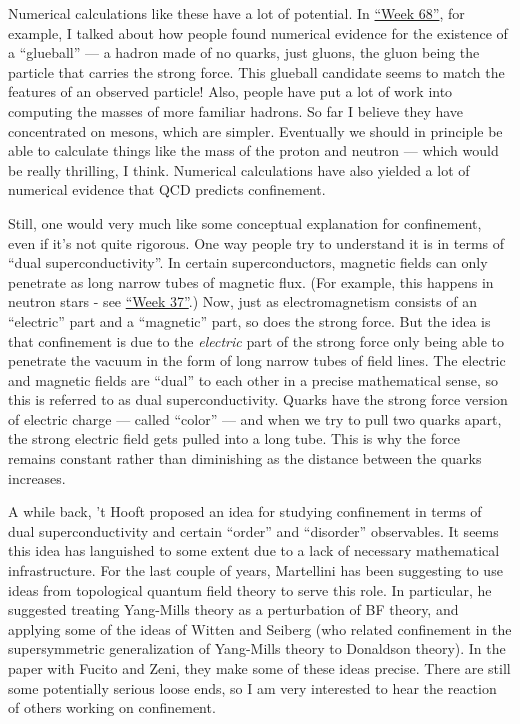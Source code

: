 \documentclass{article}
\begin{document}
Numerical calculations like these have a lot of potential. In
\protect\hyperlink{week68}{``Week 68''}, for example, I talked about how
people found numerical evidence for the existence of a ``glueball'' ---
a hadron made of no quarks, just gluons, the gluon being the particle
that carries the strong force. This glueball candidate seems to match
the features of an observed particle! Also, people have put a lot of
work into computing the masses of more familiar hadrons. So far I
believe they have concentrated on mesons, which are simpler. Eventually
we should in principle be able to calculate things like the mass of the
proton and neutron --- which would be really thrilling, I think.
Numerical calculations have also yielded a lot of numerical evidence
that QCD predicts confinement.

Still, one would very much like some conceptual explanation for
confinement, even if it's not quite rigorous. One way people try to
understand it is in terms of ``dual superconductivity''. In certain
superconductors, magnetic fields can only penetrate as long narrow tubes
of magnetic flux. (For example, this happens in neutron stars - see
\protect\hyperlink{week37}{``Week 37''}.) Now, just as electromagnetism
consists of an ``electric'' part and a ``magnetic'' part, so does the
strong force. But the idea is that confinement is due to the
\emph{electric} part of the strong force only being able to penetrate
the vacuum in the form of long narrow tubes of field lines. The electric
and magnetic fields are ``dual'' to each other in a precise mathematical
sense, so this is referred to as dual superconductivity. Quarks have the
strong force version of electric charge --- called ``color'' --- and
when we try to pull two quarks apart, the strong electric field gets
pulled into a long tube. This is why the force remains constant rather
than diminishing as the distance between the quarks increases.

A while back, 't Hooft proposed an idea for studying confinement in
terms of dual superconductivity and certain ``order'' and ``disorder''
observables. It seems this idea has languished to some extent due to a
lack of necessary mathematical infrastructure. For the last couple of
years, Martellini has been suggesting to use ideas from topological
quantum field theory to serve this role. In particular, he suggested
treating Yang-Mills theory as a perturbation of BF theory, and applying
some of the ideas of Witten and Seiberg (who related confinement in the
supersymmetric generalization of Yang-Mills theory to Donaldson theory).
In the paper with Fucito and Zeni, they make some of these ideas
precise. There are still some potentially serious loose ends, so I am
very interested to hear the reaction of others working on confinement.
\end{document}
